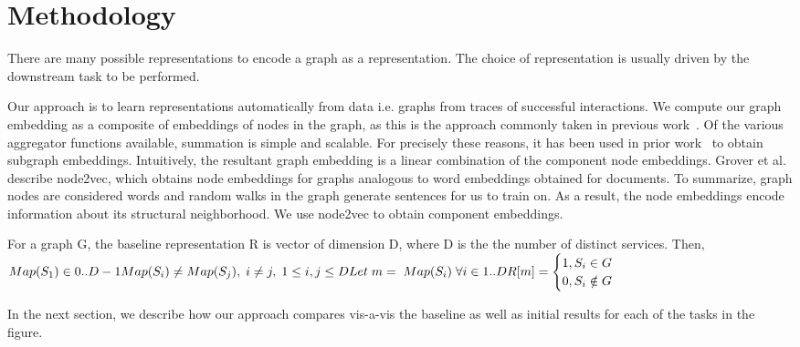 \section{Methodology}

There are many possible representations to encode a graph as a representation. The choice of representation is usually driven by the downstream task to be performed. 

Our approach is to learn representations automatically from data i.e. graphs from traces of successful interactions. We compute our graph embedding as a composite of embeddings of nodes in the graph, as this is the approach commonly taken in previous work~\cite{corr_2017_abs-1709-05584}.
Of the various aggregator functions available, summation is simple and scalable. For precisely these reasons, it has been used in prior work~\cite{DBLP:journals/corr/DuvenaudMAGHAA15, DBLP:journals/corr/DaiDS16} to obtain subgraph embeddings. Intuitively, the resultant graph embedding is a linear combination of the component node embeddings. 
Grover et al.~\cite{corr18_GroverL16} describe node2vec, which obtains node embeddings for graphs analogous to word embeddings obtained for documents. To summarize, graph nodes are considered words and random walks in the graph generate sentences for us to train on. As a result, the node embeddings encode information about its structural neighborhood. We use node2vec to obtain component embeddings.  

For a graph G, the baseline representation R is vector of dimension D, where D is the the number of distinct services. Then, \newline
\begin{math}
Map(S_{1}) \in {0..D-1} \\
Map(S_{i}) \neq Map(S_{j}),\;  i \neq j,\; 1 \leq i,j \leq D \\
    Let\; m =\; Map(S_{i})\; \forall i \in {1..D} \\
    R[m] = 
    \begin{cases}
        1, S_{i} \in G \\
        0, S_{i} \notin G \\
    \end{cases}
\end{math}

In the next section, we describe how our approach compares vis-a-vis the baseline as well as initial results for each of the tasks in the figure.
